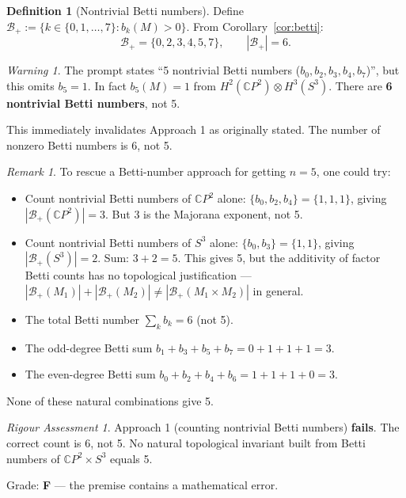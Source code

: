 \documentclass[11pt]{article}
\theoremstyle{definition}
\newtheorem{definition}[theorem]{Definition}
\theoremstyle{remark}
\newtheorem*{remark}{Remark}
\newtheorem*{warning}{Warning}
\newtheorem*{assessment}{Rigour Assessment}
\newcommand{\CP}{\mathbb{C}P}
\begin{document}
\begin{definition}[Nontrivial Betti numbers]
Define $\mathcal{B}_+ := \{k \in \{0,1,\ldots,7\} : b_k(M) > 0\}$. From
Corollary~\ref{cor:betti}:
\begin{equation}
\mathcal{B}_+ = \{0, 2, 3, 4, 5, 7\}, \qquad |\mathcal{B}_+| = 6.
\end{equation}
\end{definition}

\begin{warning}
The prompt states ``5 nontrivial Betti numbers ($b_0, b_2, b_3, b_4, b_7$)'', but
this omits $b_5 = 1$. In fact $b_5(M) = 1$ from $H^2(\CP^2) \otimes H^3(S^3)$.
There are \textbf{6 nontrivial Betti numbers}, not 5.

This immediately invalidates Approach 1 as originally stated. The number of
nonzero Betti numbers is 6, not 5.
\end{warning}

\begin{remark}
To rescue a Betti-number approach for getting $n = 5$, one could try:
\begin{itemize}
\item Count nontrivial Betti numbers of $\CP^2$ alone: $\{b_0, b_2, b_4\} = \{1,1,1\}$,
  giving $|\mathcal{B}_+(\CP^2)| = 3$. But 3 is the Majorana exponent, not 5.
\item Count nontrivial Betti numbers of $S^3$ alone: $\{b_0, b_3\} = \{1,1\}$,
  giving $|\mathcal{B}_+(S^3)| = 2$. Sum: $3 + 2 = 5$. This gives 5, but the
  additivity of factor Betti counts has no topological justification ---
  $|\mathcal{B}_+(M_1)| + |\mathcal{B}_+(M_2)| \neq |\mathcal{B}_+(M_1 \times M_2)|$
  in general.
\item The total Betti number $\sum_k b_k = 6$ (not 5).
\item The odd-degree Betti sum $b_1 + b_3 + b_5 + b_7 = 0 + 1 + 1 + 1 = 3$.
\item The even-degree Betti sum $b_0 + b_2 + b_4 + b_6 = 1 + 1 + 1 + 0 = 3$.
\end{itemize}
None of these natural combinations give 5.
\end{remark}

\begin{assessment}
Approach 1 (counting nontrivial Betti numbers) \textbf{fails}. The correct count
is 6, not 5. No natural topological invariant built from Betti numbers of
$\CP^2 \times S^3$ equals 5.

Grade: \textbf{F} --- the premise contains a mathematical error.
\end{assessment}
\end{document}
